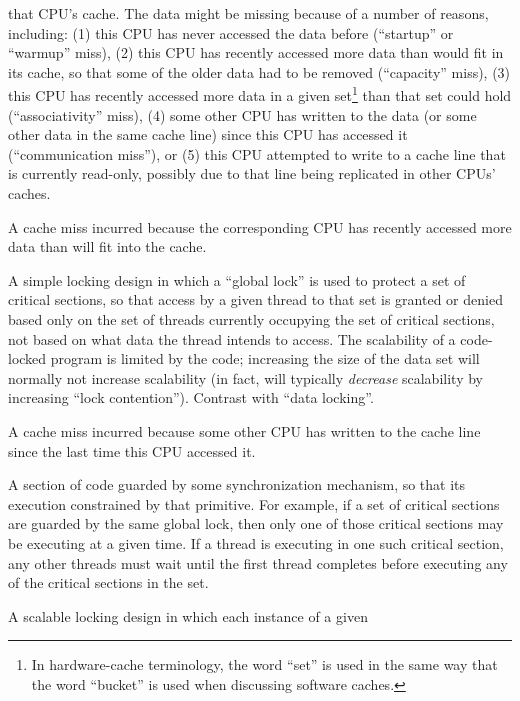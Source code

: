 \begin{description}
	that CPU's cache.
	The data might be missing because of a number of reasons,
	including:
	(1) this CPU has never accessed the data before
	(``startup'' or ``warmup'' miss),
	(2) this CPU has recently accessed more
	data than would fit in its cache, so that some of the older
	data had to be removed (``capacity'' miss),
	(3) this CPU
	has recently accessed more data in a given set\footnote{
		In hardware-cache terminology, the word ``set''
		is used in the same way that the word ``bucket''
		is used when discussing software caches.}
	than that set could hold (``associativity'' miss),
	(4) some other CPU has written to the data (or some other
	data in the same cache line) since this CPU has accessed it
	(``communication miss''), or
	(5) this CPU attempted to write to a cache line that is
	currently read-only, possibly due to that line being replicated
	in other CPUs' caches.
\item[\IXh{Capacity Miss}{Cache miss}{capacity}:]
	A cache miss incurred because the corresponding CPU has recently
	accessed more data than will fit into the cache.
\item[\IXh{Code Locking}{Locking}{code}:]
	A simple locking design in which a ``global lock'' is used to protect
	a set of critical sections, so that access by a given thread
	to that set is
	granted or denied based only on the set of threads currently
	occupying the set of critical sections, not based on what
	data the thread intends to access.
	The scalability of a code-locked program is limited by the code;
	increasing the size of the data set will normally not increase
	scalability (in fact, will typically \emph{decrease} scalability
	by increasing ``lock contention'').
	Contrast with ``data locking''.
\item[\IXh{Communication Miss}{Cache miss}{communication}:]
	A cache miss incurred because some other CPU has written to
	the cache line since the last time this CPU accessed it.
\item[\IX{Critical Section}:]
	A section of code guarded by some synchronization mechanism,
	so that its execution constrained by that primitive.
	For example, if a set of critical sections are guarded by
	the same global lock, then only one of those critical sections
	may be executing at a given time.
	If a thread is executing in one such critical section,
	any other threads must wait until the first thread completes
	before executing any of the critical sections in the set.
\item[\IXh{Data Locking}{Locking}{data}:]
	A scalable locking design in which each instance of a given

\end{description}
